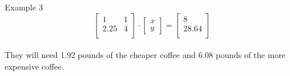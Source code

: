 \documentclass[t]{beamer}
\begin{document}
\begin{frame}{Example 3}
\[
\begin{bmatrix}
1	&	1	\\
2.25 & 4	\\
\end{bmatrix}
\cdot 
\begin{bmatrix}
x \\ y 
\end{bmatrix}
= \begin{bmatrix}
8 \\ 28.64 \\
\end{bmatrix}
\]
\vspace{6pt}
\newline\\ \pause
They will need 1.92 pounds of the cheaper coffee and 6.08 pounds of the more expensive coffee.
\end{frame}
\end{document}
